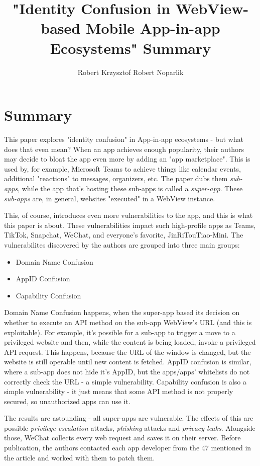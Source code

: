 \documentclass{article}
\title{"Identity Confusion in WebView-based Mobile App-in-app Ecosystems" Summary}
\author{Robert Krzysztof Robert Noparlik}
\begin{document}
\maketitle

\section{Summary}

This paper explores "identity confusion" in App-in-app ecosystems - but what does that even mean?
When an app achieves enough popularity, their authors may decide to bloat the app even more by adding an "app marketplace". This is used by, for example, Microsoft Teams to achieve things like calendar events, additional "reactions" to messages, organizers, etc. The paper dubs them \textit{sub-apps}, while the app that's hosting these sub-apps is called a \textit{super-app}. These \textit{sub-apps} are, in general, websites "executed" in a WebView instance.

This, of course, introduces even more vulnerabilities to the app, and this is what this paper is about. These vulnerabilities impact such high-profile apps as Teams, TikTok, Snapchat, WeChat, and everyone's favorite, JinRiTouTiao-Mini. The vulnerabilites discovered by the authors are grouped into three main groups:

\begin{itemize}
	\item Domain Name Confusion
	\item AppID Confusion
	\item Capability Confusion
\end{itemize}

Domain Name Confusion happens, when the super-app based its decision on whether to execute an API method on the sub-app WebView's URL (and this is exploitable). For example, it's possible for a sub-app to trigger a move to a privileged website and then, while the content is being loaded, invoke a privileged API request. This happens, because the URL of the window is changed, but the website is still operable until new content is fetched. AppID confusion is similar, where a sub-app does not hide it's AppID, but the apps/apps' whitelists do not correctly check the URL - a simple vulnerability. Capability confusion is also a simple vulnerability - it just means that some API method is not properly secured, so unauthorized apps can use it. 

The results are astounding - all super-apps are vulnerable. The effects of this are possible \textit{privilege escalation} attacks, \textit{phishing} attacks and \textit{privacy leaks}. Alongside those, WeChat collects every web request and saves it on their server. Before publication, the authors contacted each app developer from the 47 mentioned in the article and worked with them to patch them. 
\end{document}
